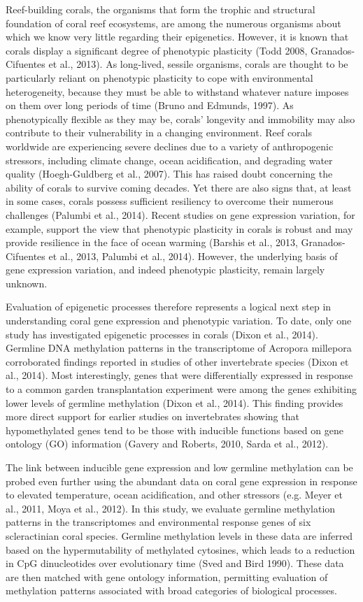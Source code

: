 Reef-building corals, the organisms that form the trophic and structural foundation of coral reef ecosystems, are among the numerous organisms about which we know very little regarding their epigenetics. However, it is known that corals display a significant degree of phenotypic plasticity (Todd 2008, Granados-Cifuentes et al., 2013). As long-lived, sessile organisms, corals are thought to be particularly reliant on phenotypic plasticity to cope with environmental heterogeneity, because they must be able to withstand whatever nature imposes on them over long periods of time (Bruno and Edmunds, 1997). As phenotypically flexible as they may be, corals’ longevity and immobility may also contribute to their vulnerability in a changing environment. Reef corals worldwide are experiencing severe declines due to a variety of anthropogenic stressors, including climate change, ocean acidification, and degrading water quality (Hoegh-Guldberg et al., 2007). This has raised doubt concerning the ability of corals to survive coming decades. Yet there are also signs that, at least in some cases, corals possess sufficient resiliency to overcome their numerous challenges (Palumbi et al., 2014). Recent studies on gene expression variation, for example, support the view that phenotypic plasticity in corals is robust and may provide resilience in the face of ocean warming (Barshis et al., 2013, Granados-Cifuentes et al., 2013, Palumbi et al., 2014). However, the underlying basis of gene expression variation, and indeed phenotypic plasticity, remain largely unknown.

Evaluation of epigenetic processes therefore represents a logical next step in understanding coral gene expression and phenotypic variation. To date, only one study has investigated epigenetic processes in corals (Dixon et al., 2014). Germline DNA methylation patterns in the transcriptome of Acropora millepora corroborated findings reported in studies of other invertebrate species (Dixon et al., 2014). Most interestingly, genes that were differentially expressed in response to a common garden transplantation experiment were among the genes exhibiting lower levels of germline methylation (Dixon et al., 2014). This finding provides more direct support for earlier studies on invertebrates showing that hypomethylated genes tend to be those with inducible functions based on gene ontology (GO) information (Gavery and Roberts, 2010, Sarda et al., 2012).

The link between inducible gene expression and low germline methylation can be probed even further using the abundant data on coral gene expression in response to elevated temperature, ocean acidification, and other stressors (e.g. Meyer et al., 2011, Moya et al., 2012). In this study, we evaluate germline methylation patterns in the transcriptomes and environmental response genes of six scleractinian coral species. Germline methylation levels in these data are inferred based on the hypermutability of methylated cytosines, which leads to a reduction in CpG dinucleotides over evolutionary time (Sved and Bird 1990). These data are then matched with gene ontology information, permitting evaluation of methylation patterns associated with broad categories of biological processes. 


